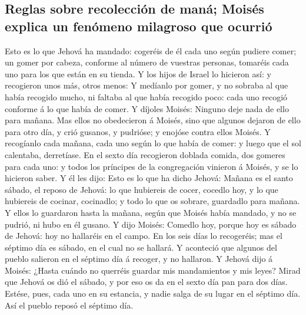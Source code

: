 \hypertarget{reglas-sobre-recolecciuxf3n-de-manuxe1-moisuxe9s-explica-un-fenuxf3meno-milagroso-que-ocurriuxf3}{%
\subsection{Reglas sobre recolección de maná; Moisés explica un fenómeno
milagroso que
ocurrió}\label{reglas-sobre-recolecciuxf3n-de-manuxe1-moisuxe9s-explica-un-fenuxf3meno-milagroso-que-ocurriuxf3}}

 Esto es lo que Jehová ha mandado: cogeréis de él cada uno
según pudiere comer; un gomer por cabeza, conforme al número de vuestras
personas, tomaréis cada uno para los que están en su tienda.
 Y los hijos de Israel lo hicieron así: y recogieron unos
más, otros menos:  Y medíanlo por gomer, y no sobraba al
que había recogido mucho, ni faltaba al que había recogido poco: cada
uno recogió conforme á lo que había de comer.  Y díjoles
Moisés: Ninguno deje nada de ello para mañana.  Mas ellos
no obedecieron á Moisés, sino que algunos dejaron de ello para otro día,
y crió gusanos, y pudrióse; y enojóse contra ellos Moisés. 
Y recogíanlo cada mañana, cada uno según lo que había de comer: y luego
que el sol calentaba, derretíase.  En el sexto día
recogieron doblada comida, dos gomeres para cada uno: y todos los
príncipes de la congregación vinieron á Moisés, y se lo hicieron saber.
 Y él les dijo: Esto es lo que ha dicho Jehová: Mañana es
el santo sábado, el reposo de Jehová: lo que hubiereis de cocer, cocedlo
hoy, y lo que hubiereis de cocinar, cocinadlo; y todo lo que os sobrare,
guardadlo para mañana.  Y ellos lo guardaron hasta la
mañana, según que Moisés había mandado, y no se pudrió, ni hubo en él
gusano.  Y dijo Moisés: Comedlo hoy, porque hoy es sábado
de Jehová: hoy no hallaréis en el campo.  En los seis días
lo recogeréis; mas el séptimo día es sábado, en el cual no se hallará.
 Y aconteció que algunos del pueblo salieron en el séptimo
día á recoger, y no hallaron.  Y Jehová dijo á Moisés:
¿Hasta cuándo no querréis guardar mis mandamientos y mis leyes?
 Mirad que Jehová os dió el sábado, y por eso os da en el
sexto día pan para dos días. Estése, pues, cada uno en su estancia, y
nadie salga de su lugar en el séptimo día.  Así el pueblo
reposó el séptimo día.

